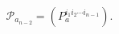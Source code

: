 \begin{equation}
\mathcal{P}_{a_{n-2}}=\left( P_{a}^{i_{1}i_{2}\cdots i_{n-1}}\right) .
\label{f22}
\end{equation}

